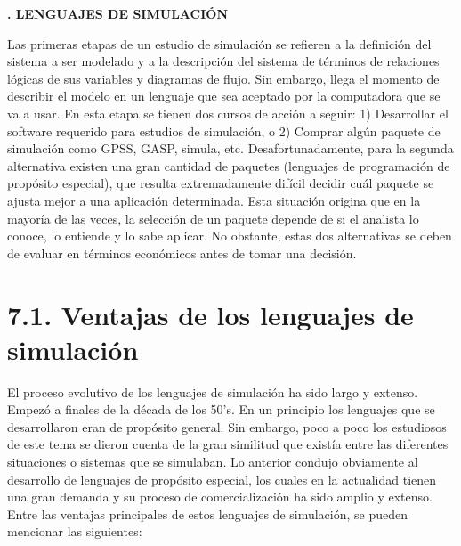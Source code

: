 \documentclass[11pt,letterpaper]{report}
\begin{document}
\begin{center}
{\LARGE\bfseries\linespread{1.3}. LENGUAJES DE SIMULACIÓN\par}
\end{center}
\vspace{0.5cm}

\setcounter{chapter}{7}
\setcounter{page}{123}

Las primeras etapas de un estudio de simulación se refieren a la
definición del sistema a ser modelado y a la descripción del sistema de
términos de relaciones lógicas de sus variables y diagramas de flujo.
Sin embargo, llega el momento de describir el modelo en un lenguaje que
sea aceptado por la computadora que se va a usar. En esta etapa se
tienen dos cursos de acción a seguir: 1) Desarrollar el software
requerido para estudios de simulación, o 2) Comprar algún paquete de
simulación como GPSS, GASP, simula, etc. Desafortunadamente, para la
segunda alternativa existen una gran cantidad de paquetes (lenguajes de
programación de propósito especial), que resulta extremadamente difícil
decidir cuál paquete se ajusta mejor a una aplicación determinada. Esta
situación origina que en la mayoría de las veces, la selección de un
paquete depende de si el analista lo conoce, lo entiende y lo sabe
aplicar. No obstante, estas dos alternativas se deben de evaluar en
términos económicos antes de tomar una decisión.

\section*{7.1. Ventajas de los lenguajes de simulación}

El proceso evolutivo de los lenguajes de simulación ha sido largo y
extenso. Empezó a finales de la década de los 50's. En un principio los
lenguajes que se desarrollaron eran de propósito general. Sin embargo,
poco a poco los estudiosos de este tema se dieron cuenta de la gran
similitud que existía entre las diferentes situaciones o sistemas que se
simulaban. Lo anterior condujo obviamente al desarrollo de lenguajes de
propósito especial, los cuales en la actualidad tienen una gran demanda
y su proceso de comercialización ha sido amplio y extenso. Entre las
ventajas principales de estos lenguajes de simulación, se pueden
mencionar las siguientes:
\end{document}

